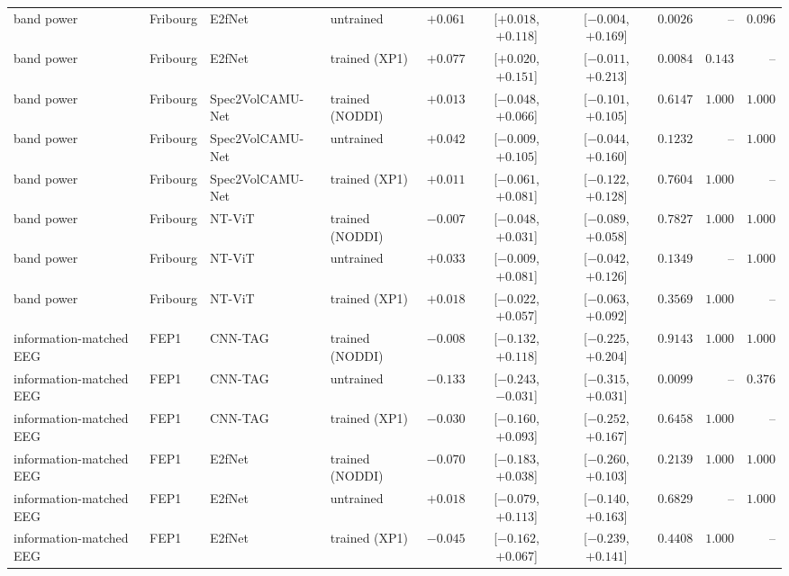 \documentclass[10pt]{article}
\begin{document}
\begin{longtable}{l l l l r c c r r r}
        band power & Fribourg & E2fNet & untrained & $+0.061$ & [$+0.018$, $+0.118$] & [$-0.004$, $+0.169$] & $0.0026$ & -- & $0.096$ \\
        band power & Fribourg & E2fNet & trained (XP1) & $+0.077$ & [$+0.020$, $+0.151$] & [$-0.011$, $+0.213$] & $0.0084$ & $0.143$ & -- \\
        band power & Fribourg & Spec2VolCAMU-Net & trained (NODDI) & $+0.013$ & [$-0.048$, $+0.066$] & [$-0.101$, $+0.105$] & $0.6147$ & $1.000$ & $1.000$ \\
        band power & Fribourg & Spec2VolCAMU-Net & untrained & $+0.042$ & [$-0.009$, $+0.105$] & [$-0.044$, $+0.160$] & $0.1232$ & -- & $1.000$ \\
        band power & Fribourg & Spec2VolCAMU-Net & trained (XP1) & $+0.011$ & [$-0.061$, $+0.081$] & [$-0.122$, $+0.128$] & $0.7604$ & $1.000$ & -- \\
        band power & Fribourg & NT-ViT & trained (NODDI) & $-0.007$ & [$-0.048$, $+0.031$] & [$-0.089$, $+0.058$] & $0.7827$ & $1.000$ & $1.000$ \\
        band power & Fribourg & NT-ViT & untrained & $+0.033$ & [$-0.009$, $+0.081$] & [$-0.042$, $+0.126$] & $0.1349$ & -- & $1.000$ \\
        band power & Fribourg & NT-ViT & trained (XP1) & $+0.018$ & [$-0.022$, $+0.057$] & [$-0.063$, $+0.092$] & $0.3569$ & $1.000$ & -- \\
        information-matched EEG & FEP1 & CNN-TAG & trained (NODDI) & $-0.008$ & [$-0.132$, $+0.118$] & [$-0.225$, $+0.204$] & $0.9143$ & $1.000$ & $1.000$ \\
        information-matched EEG & FEP1 & CNN-TAG & untrained & $-0.133$ & [$-0.243$, $-0.031$] & [$-0.315$, $+0.031$] & $0.0099$ & -- & $0.376$ \\
        information-matched EEG & FEP1 & CNN-TAG & trained (XP1) & $-0.030$ & [$-0.160$, $+0.093$] & [$-0.252$, $+0.167$] & $0.6458$ & $1.000$ & -- \\
        information-matched EEG & FEP1 & E2fNet & trained (NODDI) & $-0.070$ & [$-0.183$, $+0.038$] & [$-0.260$, $+0.103$] & $0.2139$ & $1.000$ & $1.000$ \\
        information-matched EEG & FEP1 & E2fNet & untrained & $+0.018$ & [$-0.079$, $+0.113$] & [$-0.140$, $+0.163$] & $0.6829$ & -- & $1.000$ \\
        information-matched EEG & FEP1 & E2fNet & trained (XP1) & $-0.045$ & [$-0.162$, $+0.067$] & [$-0.239$, $+0.141$] & $0.4408$ & $1.000$ & -- \\

\end{longtable}
\end{document}
